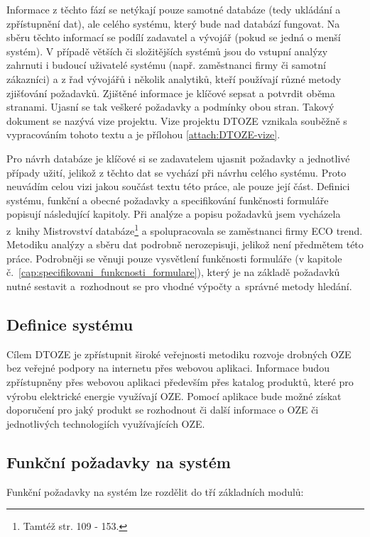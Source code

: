 \documentclass[11pt,a4paper]{article}
\begin{document}
Informace z těchto fází se netýkají pouze samotné databáze (tedy ukládání a zpřístupnění dat), ale celého systému, který bude nad databází fungovat. Na sběru těchto informací se podílí zadavatel a vývojář (pokud se jedná o menší systém). V případě větších či složitějších systémů jsou do vstupní analýzy zahrnuti i budoucí uživatelé systému (např. zaměstnanci firmy či samotní zákazníci) a z řad vývojářů i několik analytiků, kteří používají různé metody zjišťování požadavků. Zjištěné informace je klíčové sepsat a potvrdit oběma stranami. Ujasní se tak veškeré požadavky a podmínky obou stran. Takový dokument se nazývá vize projektu. Vize projektu DTOZE vznikala souběžně s vypracováním tohoto textu a je přílohou \ref{attach:DTOZE-vize}.   

Pro návrh databáze je klíčové si se zadavatelem ujasnit požadavky a jednotlivé případy užití, jelikož z těchto dat se vychází při návrhu celého systému. Proto neuvádím celou vizi jakou součást textu této práce, ale pouze její část. Definici systému, funkční a obecné požadavky a specifikování funkčnosti formuláře popisují následující kapitoly. Při analýze a popisu požadavků jsem vycházela z~knihy Mistrovství databáze\footnote{Tamtéž str. 109 - 153.} a spolupracovala se zaměstnanci firmy ECO trend. Metodiku analýzy a sběru dat podrobně nerozepisuji, jelikož není předmětem této práce. Podrobněji se věnuji pouze vysvětlení funkčnosti formuláře (v kapitole č.~\ref{cap:specifikovani_funkcnosti_formulare}), který je na základě požadavků nutné sestavit a~rozhodnout se pro vhodné výpočty a~správné metody hledání. 

\subsection{Definice systému} 
Cílem DTOZE je zpřístupnit široké veřejnosti metodiku rozvoje drobných OZE bez veřejné podpory na internetu přes webovou aplikaci. Informace budou zpřístupněny přes webovou aplikaci především  přes katalog produktů, které pro výrobu elektrické energie využívají OZE. Pomocí aplikace bude možné získat doporučení pro jaký produkt se rozhodnout či další informace o OZE či jednotlivých technologiích využívajících OZE.

\subsection{Funkční požadavky na systém}
Funkční požadavky na systém lze rozdělit do tří základních modulů:
\end{document}

